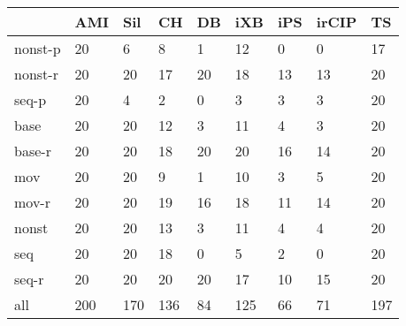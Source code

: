 \begin{tabular}{lllllllll}
\toprule
{} &  AMI &  Sil &   CH &  DB &  iXB & iPS & irCIP &   TS \\
\midrule
nonst-p &   20 &    6 &    8 &   1 &   12 &   0 &     0 &   17 \\
nonst-r &   20 &   20 &   17 &  20 &   18 &  13 &    13 &   20 \\
seq-p   &   20 &    4 &    2 &   0 &    3 &   3 &     3 &   20 \\
base    &   20 &   20 &   12 &   3 &   11 &   4 &     3 &   20 \\
base-r  &   20 &   20 &   18 &  20 &   20 &  16 &    14 &   20 \\
mov     &   20 &   20 &    9 &   1 &   10 &   3 &     5 &   20 \\
mov-r   &   20 &   20 &   19 &  16 &   18 &  11 &    14 &   20 \\
nonst   &   20 &   20 &   13 &   3 &   11 &   4 &     4 &   20 \\
seq     &   20 &   20 &   18 &   0 &    5 &   2 &     0 &   20 \\
seq-r   &   20 &   20 &   20 &  20 &   17 &  10 &    15 &   20 \\
all     &  200 &  170 &  136 &  84 &  125 &  66 &    71 &  197 \\
\bottomrule
\end{tabular}
